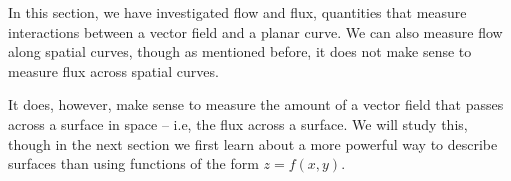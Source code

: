 In this section, we have investigated flow and flux, quantities that measure interactions between a vector field and a planar curve. We can also measure flow along spatial curves, though as mentioned before, it does not make sense to measure flux across spatial curves.

It does, however, make sense to measure the amount of a vector field that passes across a surface in space -- i.e, the flux across a surface. We will study this, though in the next section we first  learn about a more powerful way to describe surfaces than using functions of the form $z=f(x,y)$.

%

